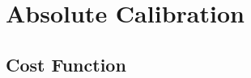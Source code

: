 \documentclass{article}
\newcommand\re{\operatorname{Re}}
\begin{document}
\begin{comment}
The chi-squared now becomes
\begin{equation}
    \chi^2(\boldsymbol{g}) = \sum_{jk} \sum_{pq} \frac{1}{\sigma_{jkpq}^2} \left| m_{jkpq} - g_{jp} g_{kq}^* v_{jkpq} \right|^2.
\end{equation}

\subsection{Jacobian Calculation}

Now taking derivatives and omitting autocorrelations (assuming $\frac{1}{\sigma_{jk}^2} = 0$ for $j=k$) gives
\begin{equation}
\begin{split}
    \frac{\partial \chi^2(\boldsymbol{g})}{\partial \re(g_{ar})} = \frac{\partial}{\partial \re(g_{ar})} \sum_{j \ne a} \sum_{pq} & \left( \frac{1}{\sigma_{ajpq}^2} \left[ |m_{ajpq}|^2 + |g_{ap}|^2 |g_{jq}|^2 |v_{ajpq}|^2 - 2 \re \left( m_{ajpq}^* g_{ap} g_{jq}^* v_{ajpq} \right) \right] \right. \\
    &\left. + \frac{1}{\sigma_{japq}^2} \left[ |m_{japq}|^2 + |g_{jp}|^2 |g_{aq}|^2 |v_{japq}|^2 - 2 \re \left( m_{japq}^* g_{jp} g_{aq}^* v_{japq} \right) \right] \right).
\end{split}
\end{equation}
Evaluating the derivative gives
\begin{equation}
\begin{split}
    \frac{\partial \chi^2(\boldsymbol{g})}{\partial \re(g_a)} = \sum_{j \ne a} 
    & \left( \frac{1}{\sigma_{aj}^2} \left[ 2 \re(g_a) |g_j|^2 |v_{aj}|^2 - 2 \re \left( m_{aj}^* g_j^* v_{aj} \right) \right] \right. \\
    &\left. + \frac{1}{\sigma_{ja}^2} \left[ 2 \re(g_a) |g_j|^2 |v_{ja}|^2 - 2 \re \left( m_{ja}^* g_j v_{ja} \right) \right] \right).
\end{split}
\end{equation}

\end{comment}

\section{Absolute Calibration}

\subsection{Cost Function}
\end{document}
